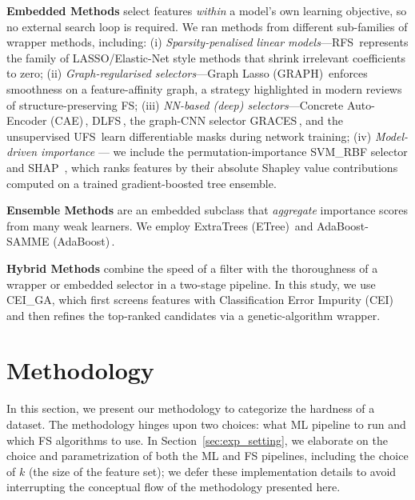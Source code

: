 \documentclass[preprint,12pt,authoryear]{elsarticle}
\begin{document}
\textbf{Embedded Methods} select features \emph{within} a model’s own learning objective, so no external search loop is required.  
We ran methods from different sub-families of wrapper methods, including: (i) \emph{Sparsity-penalised linear models}—RFS\,\cite{nie2010efficient} represents the family of LASSO/Elastic-Net style methods that shrink irrelevant coefficients to zero;  
 (ii) \emph{Graph-regularised selectors}—Graph Lasso (GRAPH)\,\cite{ye2012sparse} enforces smoothness on a feature-affinity graph, a strategy highlighted in modern reviews of structure-preserving FS; (iii) \emph{NN-based (deep) selectors}—Concrete Auto-Encoder (CAE)\,\cite{balin2019concrete}, DLFS\,\cite{wojtas2020feature}, the graph-CNN selector GRACES\,\cite{chen2023graph}, and the unsupervised UFS\,\cite{cheng2021algorithmic} learn differentiable masks during network training;   (iv) \emph{Model-driven importance} — we include the permutation-importance SVM\_RBF selector \cite{liu2011feature} and
SHAP~\cite{lundberg2017unified}, which ranks features by their absolute Shapley value contributions computed on a trained gradient-boosted tree ensemble.


\textbf{Ensemble Methods} are an embedded subclass that \emph{aggregate} importance scores from many weak learners.  
We employ ExtraTrees (ETree)\,\cite{geurts2006extremely} and AdaBoost-SAMME (AdaBoost)\,\cite{hastie2009multi}.%

\textbf{Hybrid Methods} combine the speed of a filter with the thoroughness of a wrapper or embedded selector in a two-stage pipeline.  
In this study, we use CEI\_GA\cite{nematzadeh2024feature}, which first screens features with Classification Error Impurity (CEI) and then refines the top-ranked candidates via a genetic-algorithm wrapper. %


\section{Methodology}\label{sec:methodology}
In this section, we present our methodology to categorize the hardness of a dataset. The methodology hinges upon two choices: what ML pipeline to run and which FS algorithms to use. In Section~\ref{sec:exp_setting}, we elaborate on the choice and parametrization of both the ML and FS pipelines, including the choice of $k$ (the size of the feature set); we defer these implementation details to avoid interrupting the conceptual flow of the methodology presented here.
\end{document}
